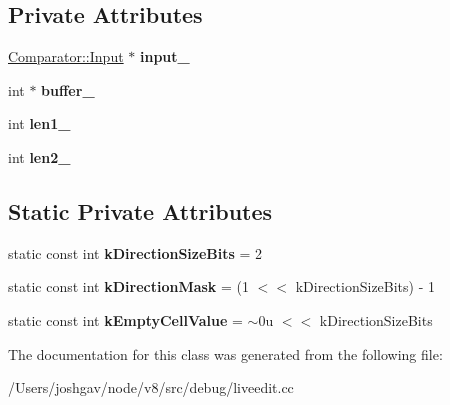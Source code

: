 \subsection*{Private Attributes}
\begin{DoxyCompactItemize}
\item 
\hyperlink{classv8_1_1internal_1_1_comparator_1_1_input}{Comparator\+::\+Input} $\ast$ {\bfseries input\+\_\+}\hypertarget{classv8_1_1internal_1_1_differencer_a6f2b27c7b8be7e9143221a748d6d6179}{}\label{classv8_1_1internal_1_1_differencer_a6f2b27c7b8be7e9143221a748d6d6179}

\item 
int $\ast$ {\bfseries buffer\+\_\+}\hypertarget{classv8_1_1internal_1_1_differencer_a0a7e1f4a1af07a0397435b12edee6f56}{}\label{classv8_1_1internal_1_1_differencer_a0a7e1f4a1af07a0397435b12edee6f56}

\item 
int {\bfseries len1\+\_\+}\hypertarget{classv8_1_1internal_1_1_differencer_a69e0b35d75e8e9a43448b741dbae59cb}{}\label{classv8_1_1internal_1_1_differencer_a69e0b35d75e8e9a43448b741dbae59cb}

\item 
int {\bfseries len2\+\_\+}\hypertarget{classv8_1_1internal_1_1_differencer_a2cddc3a3cffd43eb55457e32c8be146c}{}\label{classv8_1_1internal_1_1_differencer_a2cddc3a3cffd43eb55457e32c8be146c}

\end{DoxyCompactItemize}
\subsection*{Static Private Attributes}
\begin{DoxyCompactItemize}
\item 
static const int {\bfseries k\+Direction\+Size\+Bits} = 2\hypertarget{classv8_1_1internal_1_1_differencer_a1f3d2ae77e318aa99c00d34c22cbe483}{}\label{classv8_1_1internal_1_1_differencer_a1f3d2ae77e318aa99c00d34c22cbe483}

\item 
static const int {\bfseries k\+Direction\+Mask} = (1 $<$$<$ k\+Direction\+Size\+Bits) -\/ 1\hypertarget{classv8_1_1internal_1_1_differencer_ae4a54d31d18b2552fe90ccd739519034}{}\label{classv8_1_1internal_1_1_differencer_ae4a54d31d18b2552fe90ccd739519034}

\item 
static const int {\bfseries k\+Empty\+Cell\+Value} = $\sim$0u $<$$<$ k\+Direction\+Size\+Bits\hypertarget{classv8_1_1internal_1_1_differencer_ab3d4b0a76ab169d8d0a55697164d4abb}{}\label{classv8_1_1internal_1_1_differencer_ab3d4b0a76ab169d8d0a55697164d4abb}

\end{DoxyCompactItemize}


The documentation for this class was generated from the following file\+:\begin{DoxyCompactItemize}
\item 
/\+Users/joshgav/node/v8/src/debug/liveedit.\+cc\end{DoxyCompactItemize}

